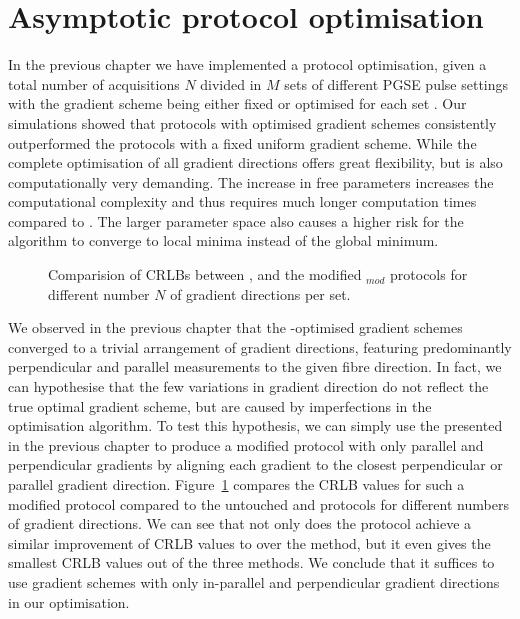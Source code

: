\section{Asymptotic protocol optimisation}
In the previous chapter we have implemented a \SF{} protocol optimisation, given a total number of acquisitions $N$ divided in $M$ sets of different {\gls{PGSE}} pulse settings with the gradient scheme being either fixed {\OI} or optimised  for each set {\FD}. Our simulations showed that protocols with optimised gradient schemes consistently outperformed the protocols with a fixed uniform gradient scheme. While the complete optimisation of all gradient directions offers great flexibility, but is also computationally very demanding. The increase in free parameters increases the computational complexity and thus requires much longer computation times compared to {\OI}. The larger parameter space also causes a higher risk for the algorithm to converge to local minima instead of the global minimum. 

\begin{figure}
\centering
	
\caption{Comparision of CRLBs between \OI{}, \SF{} and the modified \SF$_{mod}$ protocols for different number $N$ of gradient directions per set.}
\label{fig:chapter8 DIRSvsCRLB60mT mod}
\end{figure}


We observed in the previous chapter that the \SF-optimised gradient schemes converged to a trivial arrangement of gradient directions, featuring predominantly perpendicular and parallel measurements to the given fibre direction. In fact, we can hypothesise that the few variations in gradient direction do not reflect the true optimal gradient scheme, but are caused by imperfections in the optimisation algorithm. To test this hypothesis, we can simply use the \FD{} presented in the previous chapter to produce a modified \FDmod{} protocol with only parallel and perpendicular gradients by aligning each gradient  to the closest perpendicular or parallel gradient direction. Figure~\ref{fig:chapter8 DIRSvsCRLB60mT mod} compares the CRLB values for such a modified \FDmod{} protocol compared to the untouched \FD{} and \OI{} protocols for different numbers of gradient directions. We can see that not only does the \FDmod{} protocol achieve a similar improvement of CRLB values to \FD over the \OI method, but it even gives the smallest CRLB values out of the three methods. We conclude that it suffices to use gradient schemes with only  in-parallel and perpendicular gradient directions in our optimisation.
 

